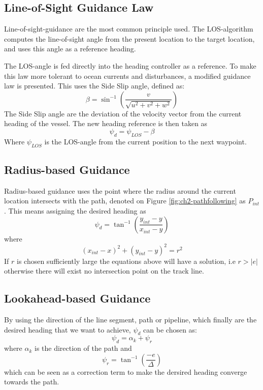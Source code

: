 	
	\subsection{Line-of-Sight Guidance Law}
	        Line-of-sight-guidance are the most common principle used. The LOS-algorithm computes
		the line-of-sight angle from the present location to the target location, and uses this
		angle as a reference heading.

		The LOS-angle is fed directly into the 
		heading controller as a reference. To make this law more tolerant to ocean currents 
		and disturbances, a modified guidance law is presented. This uses the Side Slip angle, defined as:
		\begin{equation}
			\label{eq:ch2-sideslip}
			\beta = \sin^{-1} ( \frac{v}{\sqrt{u^2 + v^2 + w^2}})
		\end{equation}
		The Side Slip angle are the deviation of the velocity vector from the current heading of the
		vessel.	The new heading reference is then taken as
		\begin{equation}
			\label{eq:ch2-los-law}
			\psi_d = \psi_{LOS} - \beta
		\end{equation}
		Where $\psi_{LOS}$ is the LOS-angle from the current position to the next waypoint. 

	\subsection{Radius-based Guidance}
		Radius-based guidance uses the point where the radius around the current location intersects
		with the path, denoted on Figure \ref{fig:ch2-pathfollowing} as $P_{int}$. This
		means assigning the desired heading as 
		\begin{equation}
			\psi_d = \tan^{-1}(\frac{y_{int} - y}{x_{int} - y})
		\end{equation}
		where 
		\begin{equation}
			(x_{int} - x)^2 + (y_{int} - y)^2 = r^2
		\end{equation}
		If $r$ is chosen sufficiently large the equations above will have a solution, i.e $r > |e|$
		otherwise there will exist no intersection point on the track line.
		\cite{guidance_planar_path}
	
	\subsection{Lookahead-based Guidance}
		By using the direction of the line segment, path or pipeline, which finally are the desired
		heading that we want to achieve, $\psi_d$ can be chosen as:
		\begin{equation}
			\psi_d = \alpha_k + \psi_r
		\end{equation}
		where $\alpha_k$ is the direction of the path and
		\begin{equation}
			\psi_r = \tan^{-1} (\frac{-e}{\Delta})
		\end{equation}
		which can be seen as a correction term to make the dersired heading converge towards the path.

